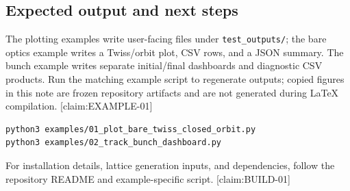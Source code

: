 \subsection{Expected output and next steps}

The plotting examples write user-facing files under \texttt{test\_outputs/}; the bare optics example writes a Twiss/orbit plot, CSV rows, and a JSON summary. The bunch example writes separate initial/final dashboards and diagnostic CSV products. Run the matching example script to regenerate outputs; copied figures in this note are frozen repository artifacts and are not generated during LaTeX compilation. [claim:EXAMPLE-01]

\begin{verbatim}
python3 examples/01_plot_bare_twiss_closed_orbit.py
python3 examples/02_track_bunch_dashboard.py
\end{verbatim}
For installation details, lattice generation inputs, and dependencies, follow the repository README and example-specific script. [claim:BUILD-01]
